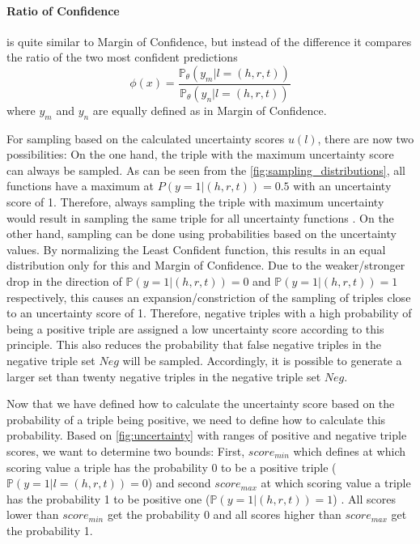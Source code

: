 \paragraph{\textbf{Ratio of Confidence}}
is quite similar to Margin of Confidence, but instead of the difference it compares the ratio of the two most confident predictions
\begin{equation}
    \phi(x) = \frac{\mathds{P}_{\theta}(y_m | l = (h,r,t))}{\mathds{P}_{\theta}(y_n | l = (h,r,t))} 
\end{equation}
where $y_m$ and $y_n$ are equally defined as in Margin of Confidence.

For sampling based on the calculated uncertainty scores $u(l)$, there are now two possibilities:
On the one hand, the triple with the maximum uncertainty score can always be sampled.
As can be seen from the \autoref{fig:sampling_distributions}, all functions have a maximum at $P(y = 1 | (h,r,t)) = 0.5$ with an uncertainty score of 1. 
Therefore, always sampling the triple with maximum uncertainty would result in sampling the same triple for all uncertainty functions \cite{nguyen2021howtomeasure, human-in-the-loop}.
On the other hand, sampling can be done using probabilities based on the uncertainty values.
By normalizing the Least Confident function, this results in an equal distribution only for this and Margin of Confidence.    
Due to the weaker/stronger drop in the direction of $\mathds{P}(y = 1 | (h,r,t)) = 0$ and $\mathds{P}(y = 1 | (h,r,t)) = 1$ respectively, this causes an expansion/constriction of the sampling of triples close to an uncertainty score of 1.
Therefore, negative triples with a high probability of being a positive triple are assigned a low uncertainty score according to this principle.
This also reduces the probability that false negative triples in the negative triple set $Neg$ will be sampled.
Accordingly, it is possible to generate a larger set than twenty negative triples in the negative triple set $Neg$.

Now that we have defined how to calculate the uncertainty score based on the probability of a triple being positive, we need to define how to calculate this probability.
Based on \autoref{fig:uncertainty} with ranges of positive and negative triple scores, we want to determine two bounds: 
First, $score_{min}$ which defines at which scoring value a triple has the probability 0 to be a positive triple ($\mathds{P}(y = 1 | l = (h,r,t)) = 0$) and second $score_{max}$ at which scoring value a triple has the probability 1 to be positive one ($\mathds{P}(y = 1 | (h,r,t)) = 1$) . 
All scores lower than $score_{min}$ get the probability 0 and all scores higher than $score_{max}$ get the probability 1.

